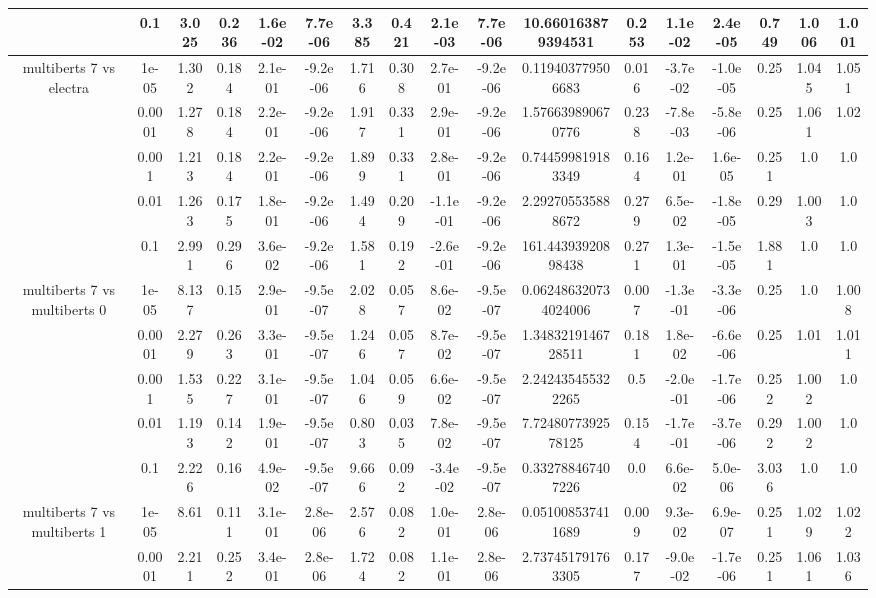 \begin{tabular}{|c|c|c|c|c|c|c|c|c|c|c|c|c|c|c|c|c|}
 & 0.1 & 3.025 & 0.236 & 1.6e-02 & 7.7e-06 & 3.385 & 0.421 & 2.1e-03 & 7.7e-06 & 10.660163879394531 & 0.253 & 1.1e-02 & 2.4e-05 & 0.749 & 1.006 & 1.001 \\
\hline
\multirow{5}{*}{multiberts 7 vs electra } & 1e-05 & 1.302 & 0.184 & 2.1e-01 & -9.2e-06 & 1.716 & 0.308 & 2.7e-01 & -9.2e-06 & 0.119403779506683 & 0.016 & -3.7e-02 & -1.0e-05 & 0.25 & 1.045 & 1.051 \\
 & 0.0001 & 1.278 & 0.184 & 2.2e-01 & -9.2e-06 & 1.917 & 0.331 & 2.9e-01 & -9.2e-06 & 1.576639890670776 & 0.238 & -7.8e-03 & -5.8e-06 & 0.25 & 1.061 & 1.02 \\
 & 0.001 & 1.213 & 0.184 & 2.2e-01 & -9.2e-06 & 1.899 & 0.331 & 2.8e-01 & -9.2e-06 & 0.744599819183349 & 0.164 & 1.2e-01 & 1.6e-05 & 0.251 & 1.0 & 1.0 \\
 & 0.01 & 1.263 & 0.175 & 1.8e-01 & -9.2e-06 & 1.494 & 0.209 & -1.1e-01 & -9.2e-06 & 2.292705535888672 & 0.279 & 6.5e-02 & -1.8e-05 & 0.29 & 1.003 & 1.0 \\
 & 0.1 & 2.991 & 0.296 & 3.6e-02 & -9.2e-06 & 1.581 & 0.192 & -2.6e-01 & -9.2e-06 & 161.44393920898438 & 0.271 & 1.3e-01 & -1.5e-05 & 1.881 & 1.0 & 1.0 \\
\hline
\multirow{5}{*}{multiberts 7 vs multiberts 0} & 1e-05 & 8.137 & 0.15 & 2.9e-01 & -9.5e-07 & 2.028 & 0.057 & 8.6e-02 & -9.5e-07 & 0.062486320734024006 & 0.007 & -1.3e-01 & -3.3e-06 & 0.25 & 1.0 & 1.008 \\
 & 0.0001 & 2.279 & 0.263 & 3.3e-01 & -9.5e-07 & 1.246 & 0.057 & 8.7e-02 & -9.5e-07 & 1.3483219146728511 & 0.181 & 1.8e-02 & -6.6e-06 & 0.25 & 1.01 & 1.011 \\
 & 0.001 & 1.535 & 0.227 & 3.1e-01 & -9.5e-07 & 1.046 & 0.059 & 6.6e-02 & -9.5e-07 & 2.242435455322265 & 0.5 & -2.0e-01 & -1.7e-06 & 0.252 & 1.002 & 1.0 \\
 & 0.01 & 1.193 & 0.142 & 1.9e-01 & -9.5e-07 & 0.803 & 0.035 & 7.8e-02 & -9.5e-07 & 7.7248077392578125 & 0.154 & -1.7e-01 & -3.7e-06 & 0.292 & 1.002 & 1.0 \\
 & 0.1 & 2.226 & 0.16 & 4.9e-02 & -9.5e-07 & 9.666 & 0.092 & -3.4e-02 & -9.5e-07 & 0.332788467407226 & 0.0 & 6.6e-02 & 5.0e-06 & 3.036 & 1.0 & 1.0 \\
\hline
\multirow{5}{*}{multiberts 7 vs multiberts 1} & 1e-05 & 8.61 & 0.111 & 3.1e-01 & 2.8e-06 & 2.576 & 0.082 & 1.0e-01 & 2.8e-06 & 0.051008537411689 & 0.009 & 9.3e-02 & 6.9e-07 & 0.251 & 1.029 & 1.022 \\
 & 0.0001 & 2.211 & 0.252 & 3.4e-01 & 2.8e-06 & 1.724 & 0.082 & 1.1e-01 & 2.8e-06 & 2.737451791763305 & 0.177 & -9.0e-02 & -1.7e-06 & 0.251 & 1.061 & 1.036 \\

\end{tabular}
